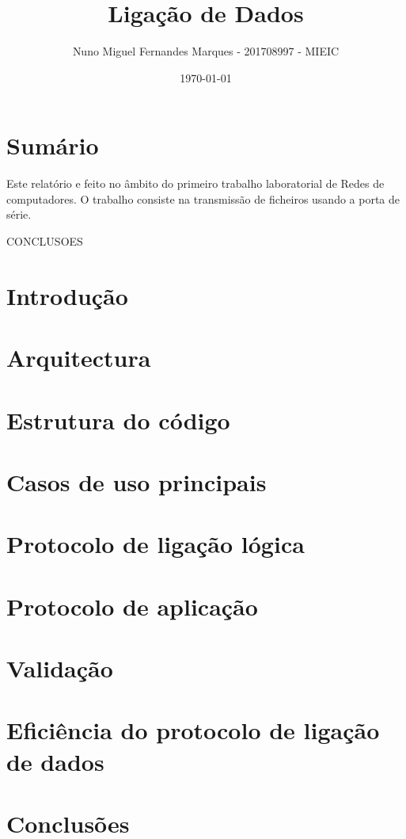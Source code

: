 \documentclass[11pt]{article}
\title{\large{\textbf{Ligação de Dados}} }
\author{Nuno Miguel Fernandes Marques - 201708997 - MIEIC}
\date{\today}
\begin{document}
\maketitle
\thispagestyle{empty}

\newpage
\thispagestyle{fancy}
\fancyhf{}
\fancyfoot[R]{\thepage}
\renewcommand*{\footrulewidth}{1pt}

\section*{Sumário}
Este relatório e feito no âmbito do primeiro trabalho laboratorial de Redes de computadores. O trabalho consiste na transmissão de ficheiros usando a porta de série.

CONCLUSOES

\section*{Introdução}

\section*{Arquitectura}

\section*{Estrutura do código}

\section*{Casos de uso principais}

\section*{Protocolo de ligação lógica}

\section*{Protocolo de aplicação}

\section*{Validação}

\section*{Eficiência do protocolo de ligação de dados}

\section*{Conclusões}
\end{document}
